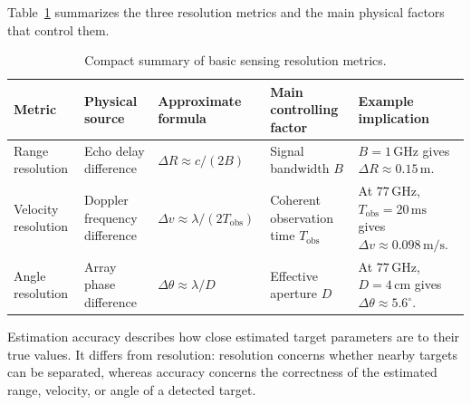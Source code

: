Table~\ref{tab:sensing_resolution_summary} summarizes the three resolution
metrics and the main physical factors that control them.
\begin{table}[htbp]
    \centering
    \caption{Compact summary of basic sensing resolution metrics.}
    \label{tab:sensing_resolution_summary}
    \small
    \renewcommand{\arraystretch}{1.25}
    \begin{tabularx}{\textwidth}{
        >{\raggedright\arraybackslash}p{}
        >{\raggedright\arraybackslash}p{}
        >{\centering\arraybackslash}p{}
        >{\raggedright\arraybackslash}p{}
        >{\raggedright\arraybackslash}X
    }
        \toprule
        Metric & Physical source & Approximate formula & Main controlling factor & Example implication \\
        \midrule
        Range resolution
        & Echo delay difference
        & \(\Delta R \approx c/(2B)\)
        & Signal bandwidth \(B\)
        & \(B=1\,\mathrm{GHz}\) gives \(\Delta R\approx0.15\,\mathrm{m}\). \\
        Velocity resolution
        & Doppler frequency difference
        & \(\Delta v \approx \lambda/(2T_{\mathrm{obs}})\)
        & Coherent observation time \(T_{\mathrm{obs}}\)
        & At \(77\,\mathrm{GHz}\), \(T_{\mathrm{obs}}=20\,\mathrm{ms}\) gives \(\Delta v\approx0.098\,\mathrm{m/s}\). \\
        Angle resolution
        & Array phase difference
        & \(\Delta\theta \approx \lambda/D\)
        & Effective aperture \(D\)
        & At \(77\,\mathrm{GHz}\), \(D=4\,\mathrm{cm}\) gives \(\Delta\theta\approx5.6^\circ\). \\
        \bottomrule
    \end{tabularx}
\end{table}

Estimation accuracy describes how close estimated target parameters are to
their true values.
It differs from resolution: resolution concerns whether nearby targets can be
separated, whereas accuracy concerns the correctness of the estimated range,
velocity, or angle of a detected target.

